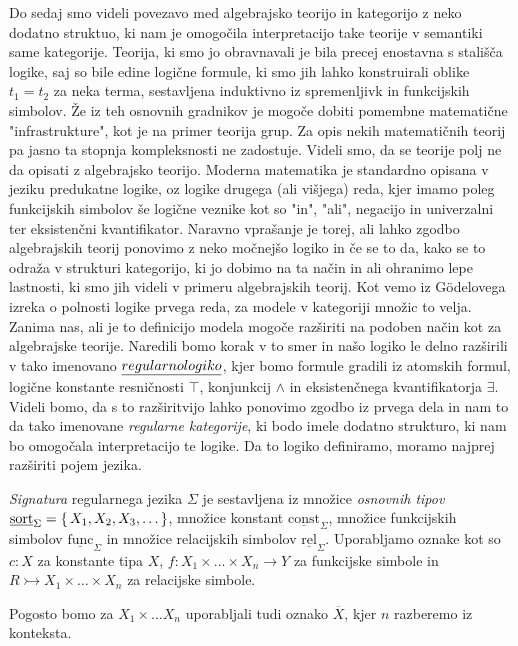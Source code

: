 \documentclass[../kategoricna_logika.tex]{subfiles}
\begin{document}
Do sedaj smo videli povezavo med algebrajsko teorijo in kategorijo z neko dodatno struktuo, ki nam je omogočila interpretacijo take teorije v semantiki same kategorije. Teorija, ki smo jo obravnavali je bila precej enostavna s stališča logike, saj so bile edine logične formule, ki smo jih lahko konstruirali oblike $t_1 = t_2$ za neka terma, sestavljena induktivno iz spremenljivk in funkcijskih simbolov. 
Že iz teh osnovnih gradnikov je mogoče dobiti pomembne matematične "infrastrukture", kot je na primer teorija grup. Za opis nekih matematičnih teorij pa jasno ta stopnja kompleksnosti ne zadostuje.
Videli smo, da se teorije polj ne da opisati z algebrajsko teorijo. Moderna matematika je standardno opisana v jeziku predukatne logike, oz logike drugega (ali višjega) reda, kjer imamo poleg funkcijskih simbolov še logične veznike kot so "in", "ali", negacijo in univerzalni ter eksistenčni kvantifikator.
Naravno vprašanje je torej, ali lahko zgodbo algebrajskih teorij ponovimo z neko močnejšo logiko in če se to da, kako se to odraža v strukturi kategorijo, ki jo dobimo na ta način in ali ohranimo lepe lastnosti, ki smo jih videli v primeru algebrajskih teorij.
Kot vemo iz Gödelovega izreka o polnosti logike prvega reda, za modele v kategoriji množic to velja. Zanima nas, ali je to definicijo modela mogoče razširiti na podoben način kot za algebrajske teorije.
Naredili bomo korak v to smer in našo logiko le delno razširili v tako imenovano $\emph{regularno logiko}$, kjer bomo formule gradili iz atomskih formul, logične konstante resničnosti $\top$, konjunkcij $\wedge$ in eksistenčnega kvantifikatorja $\exists$.
Videli bomo, da s to razširitvijo lahko ponovimo zgodbo iz prvega dela in nam to da tako imenovane \emph{regularne kategorije}, ki bodo imele dodatno strukturo, ki nam bo omogočala interpretacijo te logike.
Da to logiko definiramo, moramo najprej razširiti pojem jezika.
%
\begin{definicija}
  \emph{Signatura} regularnega jezika $\Sigma$ je sestavljena iz množice \emph{osnovnih tipov} $\underline{\mathrm{sort}}_\Sigma = \{\,X_1, X_2, X_3, \ldots\,\}$, množice konstant $\underline{\mathrm{const}}_\Sigma$, množice funkcijskih simbolov $\underline{\mathrm{func}}_\Sigma$ in množice relacijskih simbolov $\underline{\mathrm{rel}}_\Sigma$. Uporabljamo oznake kot so $c : X$ za konstante tipa $X$, $f : X_1 \times \ldots \times X_n \to Y$ za funkcijske simbole in $R \rightarrowtail X_1 \times \ldots \times X_n$ za relacijske simbole.
\end{definicija}
Pogosto bomo za $X_1 \times \ldots X_n$ uporabljali tudi oznako $\overline{X}$, kjer $n$ razberemo iz konteksta.
\end{document}

